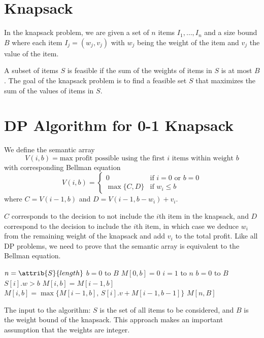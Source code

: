 \section{Knapsack} 

In the knapsack problem, we are given a set of $n$ items $I_1,\ldots,I_n$ and a size bound $B$ where each item $I_j=(w_j,v_j)$ with $w_j$ being the weight of the item and $v_j$ the value of the item.

A subset of items $S$ is feasible if the sum of the weights of items in $S$ is at most $B$. The goal of the knapsack problem is to find a feasible set $S$ that maximizes the sum of the values of items in $S$.

\section{DP Algorithm for 0-1 Knapsack}

We define the semantic array
$$
V(i,b) = \text{max profit possible using the first $i$ items within weight $b$}
$$
with corresponding Bellman equation
$$
V(i,b) = \begin{cases}
    0 & \text{if $i=0$ or $b=0$} \\
    \max\{C,D\} & \text{if $w_i \leq b$}
\end{cases}
$$
where $C = V(i-1,b)$ and $D = V(i-1,b-w_i) + v_i$.

$C$ corresponds to the decision to not include the $i$th item in the knapsack, and $D$ correspond to the decision to include the $i$th item, in which case we deduce $w_i$ from the remaining weight of the knapsack and add $v_i$ to the total profit. Like all DP problems, we need to prove that the semantic array is equivalent to the Bellman equation.

\begin{codebox}
    \li $n = \attrib{S}{length}$ 
    \li \For $b=0$ to $B$ \Do
        \li $M[0,b] = 0$
    \End
    \li \For $i=1$ to $n$ \Do
        \li \For $b = 0$ to $B$ \Do
            \li \If $S[i].w > b$ \Then
                \li $M[i,b] = M[i-1,b]$
            \li \Else
                \li $M[i,b] = \max\{M[i-1,b],\, S[i].v + M[i-1,b-1]\}$
            \End
        \End
    \End
    \li $M[n,B]$ 
\end{codebox}

The input to the algorithm: $S$ is the set of all items to be considered, and $B$ is the weight bound of the knapsack. This approach makes an important assumption that the weights are integer.

